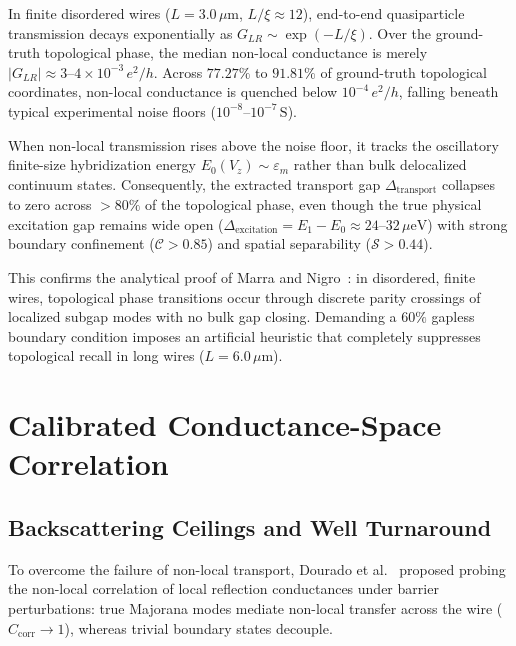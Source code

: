 \documentclass[aps,prb,reprint,superscriptaddress,amsmath,amssymb,floatfix]{revtex4-2}
\begin{document}
In finite disordered wires ($L = 3.0\,\mu\text{m}$, $L/\xi \approx 12$), end-to-end quasiparticle transmission decays exponentially as $G_{LR} \sim \exp(-L/\xi)$. Over the ground-truth topological phase, the median non-local conductance is merely $|G_{LR}| \approx 3\text{--}4 \times 10^{-3}\,e^2/h$. Across $77.27\%$ to $91.81\%$ of ground-truth topological coordinates, non-local conductance is quenched below $10^{-4}\,e^2/h$, falling beneath typical experimental noise floors ($10^{-8}\text{--}10^{-7}\,\text{S}$).

When non-local transmission rises above the noise floor, it tracks the oscillatory finite-size hybridization energy $E_0(V_z) \sim \varepsilon_m$ rather than bulk delocalized continuum states. Consequently, the extracted transport gap $\Delta_{\mathrm{transport}}$ collapses to zero across $>80\%$ of the topological phase, even though the true physical excitation gap remains wide open ($\Delta_{\mathrm{excitation}} = E_1 - E_0 \approx 24\text{--}32\,\mu\text{eV}$) with strong boundary confinement ($\mathcal{C} > 0.85$) and spatial separability ($\mathcal{S} > 0.44$).

This confirms the analytical proof of Marra and Nigro~\cite{Marra2022}: in disordered, finite wires, topological phase transitions occur through discrete parity crossings of localized subgap modes with no bulk gap closing. Demanding a $60\%$ gapless boundary condition imposes an artificial heuristic that completely suppresses topological recall in long wires ($L = 6.0\,\mu\text{m}$).

\section{Calibrated Conductance-Space Correlation}

\subsection{Backscattering Ceilings and Well Turnaround}

To overcome the failure of non-local transport, Dourado et al.~\cite{Dourado2024} proposed probing the non-local correlation of local reflection conductances under barrier perturbations: true Majorana modes mediate non-local transfer across the wire ($C_{\mathrm{corr}} \to 1$), whereas trivial boundary states decouple.
\end{document}
